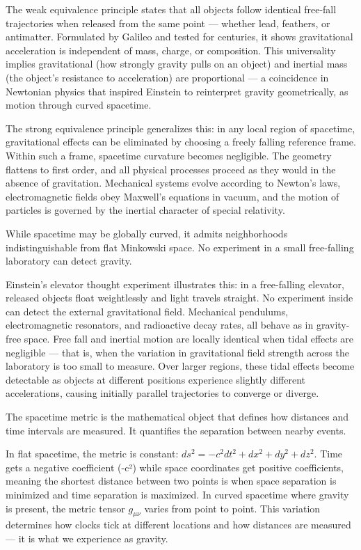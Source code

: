 
The weak equivalence principle states that all objects follow identical free-fall trajectories when released from the same point — whether lead, feathers, or antimatter. Formulated by Galileo and tested for centuries, it shows gravitational acceleration is independent of mass, charge, or composition. This universality implies gravitational (how strongly gravity pulls on an object) and inertial mass (the object's resistance to acceleration) are proportional — a coincidence in Newtonian physics that inspired Einstein to reinterpret gravity geometrically, as motion through curved spacetime.

The strong equivalence principle generalizes this: in any local region of spacetime, gravitational effects can be eliminated by choosing a freely falling reference frame. Within such a frame, spacetime curvature becomes negligible. The geometry flattens to first order, and all physical processes proceed as they would in the absence of gravitation. Mechanical systems evolve according to Newton's laws, electromagnetic fields obey Maxwell's equations in vacuum, and the motion of particles is governed by the inertial character of special relativity.

While spacetime may be globally curved, it admits neighborhoods indistinguishable from flat Minkowski space. No experiment in a small free-falling laboratory can detect gravity.

Einstein's elevator thought experiment illustrates this: in a free-falling elevator, released objects float weightlessly and light travels straight. No experiment inside can detect the external gravitational field. Mechanical pendulums, electromagnetic resonators, and radioactive decay rates, all behave as in gravity-free space. Free fall and inertial motion are locally identical when tidal effects are negligible — that is, when the variation in gravitational field strength across the laboratory is too small to measure. Over larger regions, these tidal effects become detectable as objects at different positions experience slightly different accelerations, causing initially parallel trajectories to converge or diverge.

The spacetime metric is the mathematical object that defines how distances and time intervals are measured. It quantifies the separation between nearby events.

In flat spacetime, the metric is constant: \(ds^2 = -c^2 dt^2 + dx^2 + dy^2 + dz^2\). Time gets a negative coefficient (-c²) while space coordinates get positive coefficients, meaning the shortest distance between two points is when space separation is minimized and time separation is maximized. In curved spacetime where gravity is present, the metric tensor \(g_{\mu\nu}\) varies from point to point. This variation determines how clocks tick at different locations and how distances are measured — it is what we experience as gravity.

